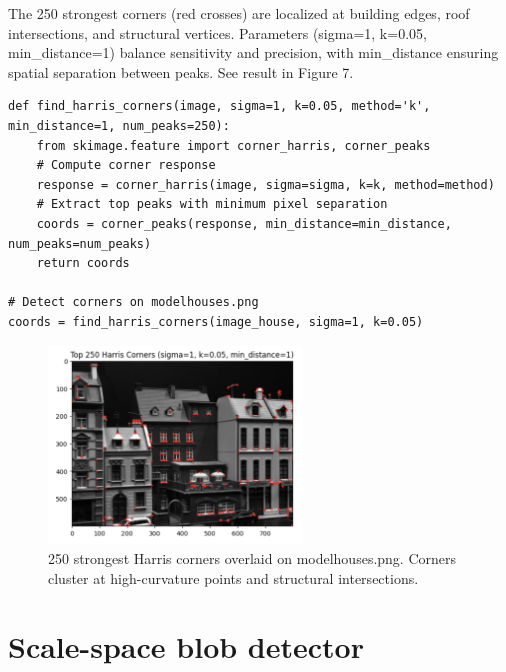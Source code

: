 \documentclass[12pt]{article}
\begin{document}
The 250 strongest corners (red crosses) are localized at building edges, roof intersections, and structural vertices. Parameters (sigma=1, k=0.05, min\_distance=1) balance sensitivity and precision, with min\_distance ensuring spatial separation between peaks. See result in Figure 7.

\begin{lstlisting}
def find_harris_corners(image, sigma=1, k=0.05, method='k', min_distance=1, num_peaks=250):
    from skimage.feature import corner_harris, corner_peaks
    # Compute corner response
    response = corner_harris(image, sigma=sigma, k=k, method=method)
    # Extract top peaks with minimum pixel separation
    coords = corner_peaks(response, min_distance=min_distance, num_peaks=num_peaks)
    return coords

# Detect corners on modelhouses.png
coords = find_harris_corners(image_house, sigma=1, k=0.05)
\end{lstlisting}

\begin{figure}[h]
    \centering
    \includegraphics[width=0.6\textwidth]{pics/a5-3.3} 
    \caption{250 strongest Harris corners overlaid on modelhouses.png. Corners cluster at high-curvature points and structural intersections.}
\end{figure}

\section{Scale-space blob detector}
\end{document}

